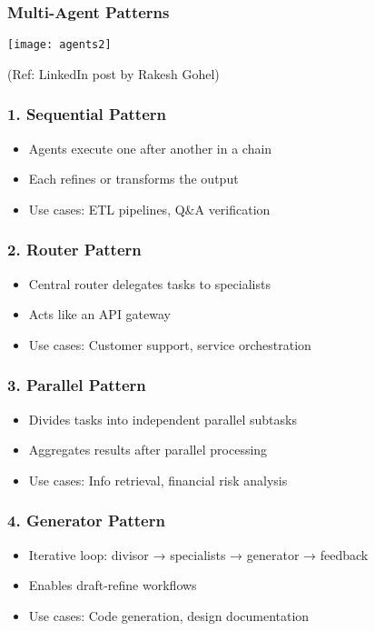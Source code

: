 \begin{frame}[fragile]\frametitle{Multi-Agent Patterns}
	
	\begin{center}
	\texttt{[image: agents2]}
	\end{center}
	
{\tiny (Ref: LinkedIn post by Rakesh Gohel)}

\end{frame}


\begin{frame}[fragile]\frametitle{1. Sequential Pattern}
    \begin{itemize}
        \item Agents execute one after another in a chain
        \item Each refines or transforms the output
        \item Use cases: ETL pipelines, Q\&A verification
    \end{itemize}
\end{frame}

\begin{frame}[fragile]\frametitle{2. Router Pattern}
    \begin{itemize}
        \item Central router delegates tasks to specialists
        \item Acts like an API gateway
        \item Use cases: Customer support, service orchestration
    \end{itemize}
\end{frame}

\begin{frame}[fragile]\frametitle{3. Parallel Pattern}
    \begin{itemize}
        \item Divides tasks into independent parallel subtasks
        \item Aggregates results after parallel processing
        \item Use cases: Info retrieval, financial risk analysis
    \end{itemize}
\end{frame}

\begin{frame}[fragile]\frametitle{4. Generator Pattern}
    \begin{itemize}
        \item Iterative loop: divisor → specialists → generator → feedback
        \item Enables draft-refine workflows
        \item Use cases: Code generation, design documentation
    \end{itemize}
\end{frame}

